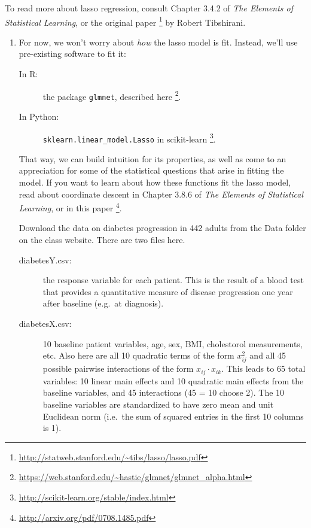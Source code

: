 \documentclass[11 pt]{article}
\begin{document}
To read more about lasso regression, consult Chapter 3.4.2 of \textit{The Elements of Statistical Learning}, or the original paper \footnote{\url{http://statweb.stanford.edu/~tibs/lasso/lasso.pdf}} by Robert Tibshirani.

\newpage

\begin{enumerate}[label=(\Alph*)]

\item For now, we won't worry about \textit{how} the lasso model is fit.  Instead, we'll use pre-existing software to fit it:
\begin{description}
	\item[In R:] the package \verb|glmnet|, described here \footnote{\url{https://web.stanford.edu/~hastie/glmnet/glmnet_alpha.html}}.
	\item[In Python:] \verb|sklearn.linear_model.Lasso| in scikit-learn \footnote{\url{http://scikit-learn.org/stable/index.html}}.
\end{description}
That way, we can build intuition for its properties, as well as come to an appreciation for some of the statistical questions that arise in fitting the model.  If you want to learn about how these functions fit the lasso model, read about coordinate descent in Chapter 3.8.6 of \textit{The Elements of Statistical Learning}, or in this paper \footnote{\url{http://arxiv.org/pdf/0708.1485.pdf}}.

Download the data on diabetes progression in 442 adults from the Data folder on the class website.  There are two files here.
\begin{description}
	\item[diabetesY.csv:] the response variable for each patient.  This is the result of a blood test that provides a quantitative measure of disease progression one year after baseline (e.g.~at diagnosis).
	\item[diabetesX.csv:] 10 baseline patient variables, age, sex, BMI, cholestorol measurements, etc.  Also here are all 10 quadratic terms of the form $x_{ij}^2$ and all 45 possible pairwise interactions of the form $x_{ij} \cdot x_{ik}$.  This leads to 65 total variables: 10 linear main effects and 10 quadratic main effects from the baseline variables, and 45 interactions (45 = 10 choose 2).  The 10  baseline variables are standardized to have zero mean and unit Euclidean norm (i.e.~the sum of squared entries in the first 10 columns is 1).
\end{description}


\end{enumerate}
\end{document}

